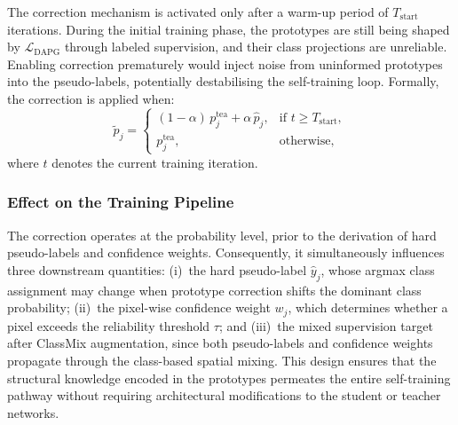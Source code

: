 The correction mechanism is activated only after a warm-up period of $T_{\text{start}}$ iterations. During the initial training phase, the prototypes are still being shaped by $\mathcal{L}_{\text{DAPG}}$ through labeled supervision, and their class projections are unreliable. Enabling correction prematurely would inject noise from uninformed prototypes into the pseudo-labels, potentially destabilising the self-training loop. Formally, the correction is applied when:
\begin{equation}
    \tilde{p}_j =
    \begin{cases}
        (1 - \alpha)\, p_j^{\text{tea}} + \alpha\, \hat{p}_j, & \text{if } t \geq T_{\text{start}}, \\
        p_j^{\text{tea}}, & \text{otherwise},
    \end{cases}
    \label{eq:delayed_activation}
\end{equation}
where $t$ denotes the current training iteration.

\subsubsection{Effect on the Training Pipeline}

The correction operates at the probability level, prior to the derivation of hard pseudo-labels and confidence weights. Consequently, it simultaneously influences three downstream quantities: (i)~the hard pseudo-label $\hat{y}_j$, whose argmax class assignment may change when prototype correction shifts the dominant class probability; (ii)~the pixel-wise confidence weight $w_j$, which determines whether a pixel exceeds the reliability threshold $\tau$; and (iii)~the mixed supervision target after ClassMix augmentation, since both pseudo-labels and confidence weights propagate through the class-based spatial mixing. This design ensures that the structural knowledge encoded in the prototypes permeates the entire self-training pathway without requiring architectural modifications to the student or teacher networks.
